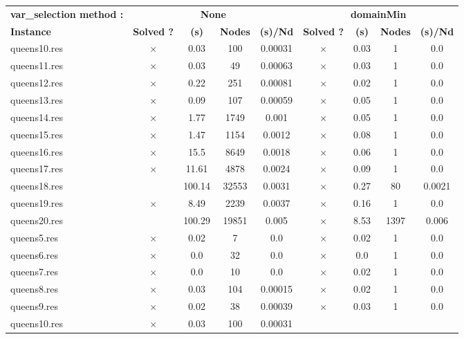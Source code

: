\documentclass[main.tex]{subfiles}
\begin{document}
\thispagestyle{empty}

\begin{landscape}
\begin{center}
\renewcommand{\arraystretch}{1.4} 
\begin{tabular}{|l|cccc|cccc|}
	\hline
\textbf{var_selection method :} & \multicolumn{4}{c}{\textbf{None}} & \multicolumn{4}{c}{\textbf{domainMin}}\\
\textbf{Instance}  & \textbf{Solved ?} & \textbf{(s)} & \textbf{Nodes} & \textbf{(s)/Nd} & \textbf{Solved ?} & \textbf{(s)} & \textbf{Nodes} & \textbf{(s)/Nd}\\\hline

queens10.res & $\times$ & 0.03 & 100 & 0.00031
 & $\times$ & 0.03 & 1 & 0.0
\\
queens11.res & $\times$ & 0.03 & 49 & 0.00063
 & $\times$ & 0.03 & 1 & 0.0
\\
queens12.res & $\times$ & 0.22 & 251 & 0.00081
 & $\times$ & 0.02 & 1 & 0.0
\\
queens13.res & $\times$ & 0.09 & 107 & 0.00059
 & $\times$ & 0.05 & 1 & 0.0
\\
queens14.res & $\times$ & 1.77 & 1749 & 0.001
 & $\times$ & 0.05 & 1 & 0.0
\\
queens15.res & $\times$ & 1.47 & 1154 & 0.0012
 & $\times$ & 0.08 & 1 & 0.0
\\
queens16.res & $\times$ & 15.5 & 8649 & 0.0018
 & $\times$ & 0.06 & 1 & 0.0
\\
queens17.res & $\times$ & 11.61 & 4878 & 0.0024
 & $\times$ & 0.09 & 1 & 0.0
\\
queens18.res &  & 100.14 & 32553 & 0.0031
 & $\times$ & 0.27 & 80 & 0.0021
\\
queens19.res & $\times$ & 8.49 & 2239 & 0.0037
 & $\times$ & 0.16 & 1 & 0.0
\\
queens20.res &  & 100.29 & 19851 & 0.005
 & $\times$ & 8.53 & 1397 & 0.006
\\
queens5.res & $\times$ & 0.02 & 7 & 0.0
 & $\times$ & 0.02 & 1 & 0.0
\\
queens6.res & $\times$ & 0.0 & 32 & 0.0
 & $\times$ & 0.0 & 1 & 0.0
\\
queens7.res & $\times$ & 0.0 & 10 & 0.0
 & $\times$ & 0.02 & 1 & 0.0
\\
queens8.res & $\times$ & 0.03 & 104 & 0.00015
 & $\times$ & 0.02 & 1 & 0.0
\\
queens9.res & $\times$ & 0.02 & 38 & 0.00039
 & $\times$ & 0.03 & 1 & 0.0
\\
queens10.res & $\times$ & 0.03 & 100 & 0.00031

\end{tabular}
\end{center}
\end{landscape}
\end{document}
